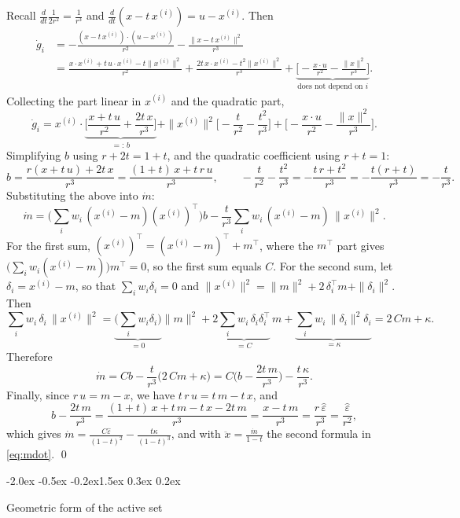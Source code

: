 \documentclass{article}
\makeatletter
\renewcommand{\section}{\@startsection{section}{1}{\z@}%
  {-2.0ex \@plus -0.5ex \@minus -0.2ex}{1.5ex \@plus 0.3ex \@minus 0.2ex}{\large\bfseries\raggedright}}
\theoremstyle{remark}
\newcommand{\xn}[1]{x^{(#1)}}
\newcommand{\eps}{\hat\varepsilon}
\makeatother
\begin{document}
Recall $\frac{d}{dt}\frac{1}{2r^2} = \frac{1}{r^3}$ and $\frac{d}{dt}(x - t\,\xn{i}) = u - \xn{i}$. Then
\begin{align*}
  \dot g_i&= -\frac{(x - t\,\xn{i}) \cdot (u - \xn{i})}{r^2} - \frac{\|x - t\,\xn{i}\|^2}{r^3}\\
  &= \frac{x \cdot \xn{i} + t\,u \cdot \xn{i} - t\|\xn{i}\|^2}{r^2} + \frac{2t\,x \cdot \xn{i} - t^2\|\xn{i}\|^2}{r^3}
   + \underbrace{\Big[-\frac{x \cdot u}{r^2} - \frac{\|x\|^2}{r^3}\Big]}_{\text{does not depend on }i}.
\end{align*}
Collecting the part linear in $\xn{i}$ and the quadratic part,
\[
  \dot g_i = \xn{i} \cdot \underbrace{\Big[\frac{x + t\,u}{r^2} + \frac{2t\,x}{r^3}\Big]}_{=:\,b}
  + \|\xn{i}\|^2\Big[-\frac{t}{r^2} - \frac{t^2}{r^3}\Big]
  + \Big[-\frac{x \cdot u}{r^2} - \frac{\|x\|^2}{r^3}\Big].
\]
Simplifying $b$ using $r + 2t = 1 + t$, and the quadratic coefficient using $r + t = 1$:
\[
  b = \frac{r(x + t\,u) + 2t\,x}{r^3} = \frac{(1 + t)\,x + t\,r\,u}{r^3},\qquad
  -\frac{t}{r^2} - \frac{t^2}{r^3} = -\frac{t\,r + t^2}{r^3} = -\frac{t(r + t)}{r^3} = -\frac{t}{r^3}.
\]
Substituting the above into $\dot m$:
\[
  \dot m = \Big(\sum_iw_i\,(\xn{i} - m)(\xn{i})^\top\Big)b - \frac{t}{r^3}\sum_iw_i\,(\xn{i} - m)\,\|\xn{i}\|^2 .
\]
For the first sum, $(\xn{i})^\top = (\xn{i} - m)^\top + m^\top$, where the $m^\top$ part gives $\big(\sum_iw_i(\xn{i} - m)\big)m^\top = 0$, so the first sum equals $C$. For the second sum, let $\delta_i = \xn{i} - m$, so that $\sum_iw_i\delta_i = 0$ and $\|\xn{i}\|^2 = \|m\|^2 + 2\,\delta_i^\top m + \|\delta_i\|^2$. Then
\[
  \sum_iw_i\,\delta_i\,\|\xn{i}\|^2
  = \underbrace{\Big(\sum_iw_i\delta_i\Big)}_{= 0}\|m\|^2
  + 2\underbrace{\sum_iw_i\,\delta_i\delta_i^\top}_{= C}\,m
  + \underbrace{\sum_iw_i\,\|\delta_i\|^2\delta_i}_{= \kappa}
  = 2\,Cm + \kappa .
\]
Therefore
\[
  \dot m = Cb - \frac{t}{r^3}\big(2\,Cm + \kappa\big) = C\Big(b - \frac{2t\,m}{r^3}\Big) - \frac{t\,\kappa}{r^3}.
\]
Finally, since $r\,u = m - x$, we have $t\,r\,u = t\,m - t\,x$, and
\[
  b - \frac{2t\,m}{r^3} = \frac{(1 + t)\,x + t\,m - t\,x - 2t\,m}{r^3} = \frac{x - t\,m}{r^3} = \frac{r\,\eps}{r^3} = \frac{\eps}{r^2},
\]
which gives $\dot m = \frac{C\eps}{(1 - t)^2} - \frac{t\kappa}{(1 - t)^3}$, and with $\ddot x = \frac{\dot m}{1 - t}$ the second formula in \eqref{eq:mdot}. \qed

\section{Geometric form of the active set}\label{app:active}
\end{document}
